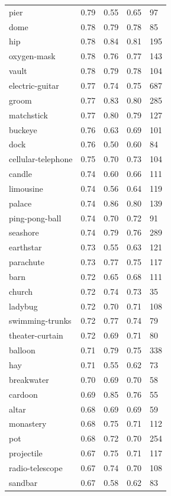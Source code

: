 \begin{center}
\begin{longtable}{lllll}
pier & 0.79 & 0.55 & 0.65 & 97 \\
dome & 0.78 & 0.79 & 0.78 & 85 \\
hip & 0.78 & 0.84 & 0.81 & 195 \\
oxygen-mask & 0.78 & 0.76 & 0.77 & 143 \\
vault & 0.78 & 0.79 & 0.78 & 104 \\
electric-guitar & 0.77 & 0.74 & 0.75 & 687 \\
groom & 0.77 & 0.83 & 0.80 & 285 \\
matchstick & 0.77 & 0.80 & 0.79 & 127 \\
buckeye & 0.76 & 0.63 & 0.69 & 101 \\
dock & 0.76 & 0.50 & 0.60 & 84 \\
cellular-telephone & 0.75 & 0.70 & 0.73 & 104 \\
candle & 0.74 & 0.60 & 0.66 & 111 \\
limousine & 0.74 & 0.56 & 0.64 & 119 \\
palace & 0.74 & 0.86 & 0.80 & 139 \\
ping-pong-ball & 0.74 & 0.70 & 0.72 & 91 \\
seashore & 0.74 & 0.79 & 0.76 & 289 \\
earthstar & 0.73 & 0.55 & 0.63 & 121 \\
parachute & 0.73 & 0.77 & 0.75 & 117 \\
barn & 0.72 & 0.65 & 0.68 & 111 \\
church & 0.72 & 0.74 & 0.73 & 35 \\
ladybug & 0.72 & 0.70 & 0.71 & 108 \\
swimming-trunks & 0.72 & 0.77 & 0.74 & 79 \\
theater-curtain & 0.72 & 0.69 & 0.71 & 80 \\
balloon & 0.71 & 0.79 & 0.75 & 338 \\
hay & 0.71 & 0.55 & 0.62 & 73 \\
breakwater & 0.70 & 0.69 & 0.70 & 58 \\
cardoon & 0.69 & 0.85 & 0.76 & 55 \\
altar & 0.68 & 0.69 & 0.69 & 59 \\
monastery & 0.68 & 0.75 & 0.71 & 112 \\
pot & 0.68 & 0.72 & 0.70 & 254 \\
projectile & 0.67 & 0.75 & 0.71 & 117 \\
radio-telescope & 0.67 & 0.74 & 0.70 & 108 \\
sandbar & 0.67 & 0.58 & 0.62 & 83 \\

\end{longtable}
\end{center}
